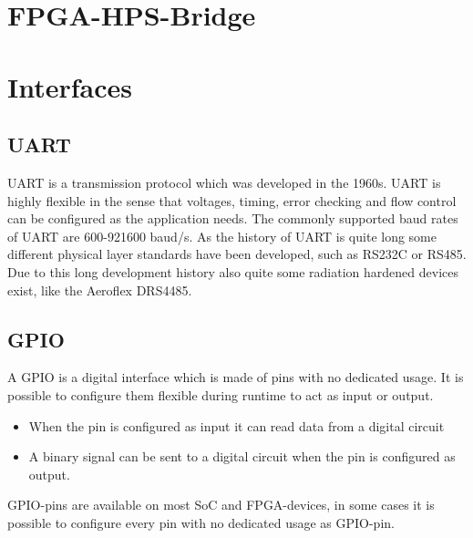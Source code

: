 \section{FPGA-HPS-Bridge}
\section{Interfaces}
\subsection{UART}
UART is a transmission protocol which was developed in the 1960s. UART is highly flexible in the sense that voltages, timing, error checking and flow control can be configured as the application needs. The commonly supported baud rates of UART are 600-921600 baud/s. As the history of UART is quite long some different physical layer standards have been developed, such as RS232C or RS485. Due to this long development history also quite some radiation hardened devices exist, like the Aeroflex DRS4485.\cite{aeroflex14}
\subsection{GPIO}
A GPIO is a digital interface which is made of pins with no dedicated usage. It is possible to configure them flexible during runtime to act as input or output.
\begin{itemize}
\item When the pin is configured as input it can read data from a digital circuit
\item A binary signal can be sent to a digital circuit when the pin is configured as output.
\end{itemize}
GPIO-pins are available on most SoC and FPGA-devices, in some cases it is possible to configure every pin with no dedicated usage as GPIO-pin.\cite{kernelgpio15}
